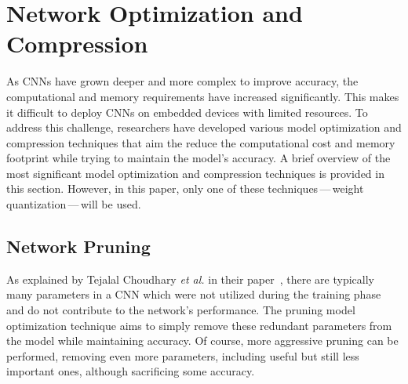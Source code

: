 






\section{Network Optimization and Compression}

As CNNs have grown deeper and more complex to improve accuracy, the
computational and memory requirements have increased significantly. This makes
it difficult to deploy CNNs on embedded devices with limited resources. To
address this challenge, researchers have developed various model optimization
and compression techniques that aim the reduce the computational cost and memory
footprint while trying to maintain the model's accuracy. A brief overview of the
most significant model optimization and compression techniques is provided in
this section. However, in this paper, only one of these techniques\,---\,weight
quantization\,---\,will be used.


\subsection{Network Pruning}

As explained by Tejalal Choudhary \textit{et al.} in their
paper~\cite{Choudhary2020}, there are typically many parameters in a CNN which
were not utilized during the training phase and do not contribute to the
network's performance. The pruning model optimization technique aims to simply
remove these redundant parameters from the model while maintaining accuracy. Of
course, more aggressive pruning can be performed, removing even more parameters,
including useful but still less important ones, although sacrificing some
accuracy.

